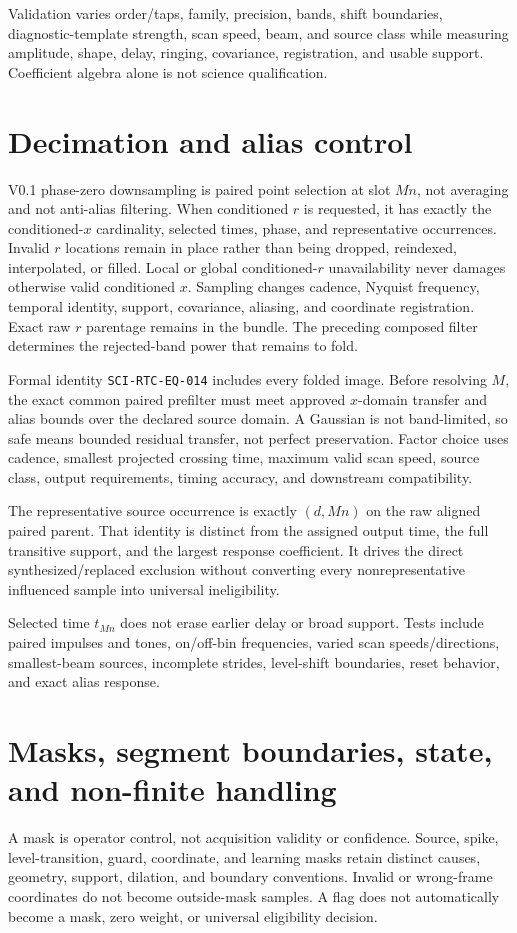 \documentclass[10pt]{article}
\begin{document}
Validation varies order/taps, family, precision, bands, shift boundaries,
diagnostic-template strength, scan speed, beam, and source class while measuring
amplitude, shape, delay, ringing, covariance, registration, and usable
support.  Coefficient algebra alone is not science qualification.

\section{Decimation and alias control}
\label{sec:rat-decimation}
V0.1 phase-zero downsampling is paired point selection at slot $Mn$, not
averaging and not anti-alias filtering.  When conditioned $r$ is requested,
it has exactly the conditioned-$x$ cardinality, selected times, phase, and
representative occurrences.  Invalid $r$ locations remain in place rather
than being dropped, reindexed, interpolated, or filled.  Local or global
conditioned-$r$ unavailability never damages otherwise valid conditioned
$x$.  Sampling changes cadence, Nyquist frequency, temporal identity, support,
covariance, aliasing, and coordinate registration.  Exact raw $r$ parentage
remains in the bundle.  The
preceding composed filter determines the rejected-band power that remains to
fold.

Formal identity \texttt{SCI-RTC-EQ-014} includes every folded image.  Before resolving $M$,
the exact common paired prefilter must meet approved $x$-domain transfer and alias
bounds over the declared source domain.  A
Gaussian is not band-limited, so safe means bounded residual transfer, not
perfect preservation.  Factor choice uses cadence, smallest projected
crossing time, maximum valid scan speed, source class, output requirements,
timing accuracy, and downstream compatibility.

The representative source occurrence is exactly $(d,Mn)$ on the raw aligned
paired parent.  That identity is distinct from the assigned output
time, the full transitive support, and the largest response coefficient.  It
drives the direct synthesized/replaced exclusion without converting every
nonrepresentative influenced sample into universal ineligibility.

Selected time $t_{Mn}$ does not erase earlier delay or broad support.  Tests
include paired impulses and tones, on/off-bin frequencies, varied scan
speeds/directions, smallest-beam sources, incomplete strides, level-shift
boundaries, reset behavior, and exact alias response.

\section{Masks, segment boundaries, state, and non-finite handling}
\label{sec:rat-masks-state}
A mask is operator control, not acquisition validity or confidence.  Source,
spike, level-transition, guard, coordinate, and learning masks retain distinct
causes, geometry, support, dilation, and boundary conventions.  Invalid or
wrong-frame coordinates do not become outside-mask samples.  A flag does not
automatically become a mask, zero weight, or universal eligibility decision.
\end{document}
